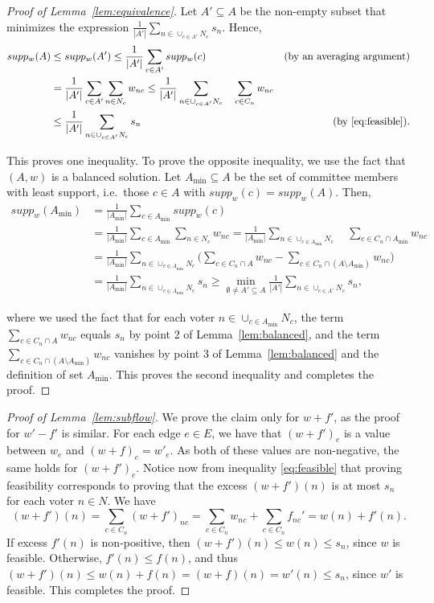 \begin{proof}[Proof of Lemma~\ref{lem:equivalence}]
Let $A'\subseteq A$ be the non-empty subset that minimizes the expression $\frac{1}{|A'|} \sum_{n\in \cup_{c\in A'} N_c} s_n$. Hence, 
\begin{align*}
    supp_w(A) &\leq supp_w(A') \leq \frac{1}{|A'|} \sum_{c\in A'} supp_w(c) &\text{(by an averaging argument)}\\
    & = \frac{1}{|A'|} \sum_{c\in A'} \sum_{n\in N_c} w_{nc} 
     \leq \frac{1}{|A'|}  \sum_{n\in \cup_{c\in A'} N_c} \quad \sum_{c\in C_n} w_{nc} \\
    & \leq \frac{1}{|A'|} \sum_{n\in \cup_{c\in A'} N_c} s_n &\text{(by \ref{eq:feasible})}.
\end{align*}

This proves one inequality. To prove the opposite inequality, we use the fact that $(A,w)$ is a balanced solution. 
Let $A_{\min}\subseteq A$ be the set of committee members with least support, i.e.~those $c\in A$ with $supp_w(c)=supp_w(A)$. Then,
\begin{align*}
    supp_w(A_{\min}) &= \frac{1}{|A_{\min}|} \sum_{c\in A_{\min}} supp_w(c) \\
    &= \frac{1}{|A_{\min}|} \sum_{c\in A_{\min}} \sum_{n\in N_c} w_{nc} 
    = \frac{1}{|A_{\min}|} \sum_{n\in \cup_{c\in A_{\min}} N_c} \quad \sum_{c\in C_n\cap A_{\min}} w_{nc} \\
    &= \frac{1}{|A_{\min}|} \sum_{n\in \cup_{c\in A_{\min}} N_c} \Big( \sum_{c\in C_n\cap A} w_{nc} 
		- \sum_{c\in C_n \cap (A\setminus A_{\min})} w_{nc}\Big)\\
		&= \frac{1}{|A_{\min}|}\sum_{n\in \cup_{c\in A_{\min}} N_c} s_n \geq \min_{\emptyset\neq A'\subseteq A} \frac{1}{|A'|}\sum_{n\in \cup_{c\in A'}N_c} s_n,
\end{align*}

where we used the fact that for each voter $n\in \cup_{c\in A_{\min}} N_c$, the term $\sum_{c\in C_n\cap A} w_{nc}$ equals $s_n$ by point 2 of Lemma~\ref{lem:balanced}, and the term $\sum_{c\in C_n \cap (A\setminus A_{\min})} w_{nc}$ vanishes by point 3 of Lemma~\ref{lem:balanced} and the definition of set $A_{\min}$. 
This proves the second inequality and completes the proof.
\end{proof}


\begin{proof}[Proof of Lemma~\ref{lem:subflow}]
We prove the claim only for $w+f'$, as the proof for $w'-f'$ is similar. 
For each edge $e\in E$, we have that $(w+f')_e$ is a value between $w_e$ and $(w+f)_e=w'_e$. As both of these values are non-negative, the same holds for $(w+f')_e$. 
Notice now from inequality \eqref{eq:feasible} that proving feasibility corresponds to proving that the excess $(w+f')(n)$ is at most $s_n$ for each voter $n\in N$. We have 
$$(w+f')(n) = \sum_{c\in C_n} (w+f')_{nc}= \sum_{c\in C_n} w_{nc} + \sum_{c\in C_n} f_{nc}' = w(n) + f'(n). $$
If excess $f'(n)$ is non-positive, then $(w+f')(n)\leq w(n) \leq s_n$, since $w$ is feasible. 
Otherwise, $f'(n)\leq f(n)$, and thus $(w+f')(n)\leq w(n) + f(n) = (w+f)(n) = w'(n) \leq s_n$, since $w'$ is feasible. This completes the proof.
\end{proof}



